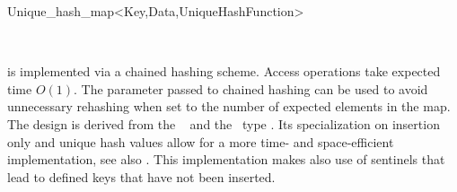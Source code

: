 \begin{ccRefClass}{Unique_hash_map<Key,Data,UniqueHashFunction>}
\vspace*{-5mm}
\ccSeeAlso

\\

\ccImplementation

 is implemented via a chained hashing scheme. Access
operations \ccVar\ccc{[i]} take expected time $O(1)$. The 
parameter passed to chained hashing can be used to avoid unnecessary 
rehashing when set to the number of expected elements in the map.
The design is derived from the \stl\  and the \leda\ type
. Its specialization on insertion only and unique hash values 
allow for a more time- and space-efficient implementation, see also
\cite[Chapter 5]{mn-l-99}. This implementation makes also use
of sentinels that lead to defined keys that have not been inserted.

\end{ccRefClass}




